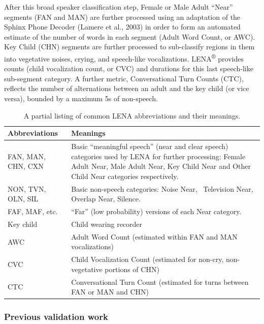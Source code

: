 \documentclass[english,table,man,floatsintext]{apa6}
\begin{document}
After this broad speaker classification step, Female or Male Adult
\enquote{Near} segments (FAN and MAN) are further processed using an
adaptation of the Sphinx Phone Decoder (Lamere et al., 2003) in order to
form an automated estimate of the number of words in each segment (Adult
Word Count, or AWC). Key Child (CHN) segments are further processed to
sub-classify regions in them into vegetative noises, crying, and
speech-like vocalizations. LENA\textsuperscript{®} provides counts
(child vocalization count, or CVC) and durations for this last
speech-like sub-segment category. A further metric, Conversational Turn
Counts (CTC), reflects the number of alternations between an adult and
the key child (or vice versa), bounded by a maximum 5s of non-speech.

\begin{table}

\caption{\label{tab:tab-abb}A partial listing of common LENA abbreviations and their meanings.}
\centering
\begin{tabular}[t]{>{\raggedright\arraybackslash}p{12em}>{\raggedright\arraybackslash}p{28em}}
\toprule
Abbreviations & Meanings\\
\midrule
FAN, MAN, CHN, CXN & Basic “meaningful speech” (near and clear speech) categories used by LENA for further processing: Female Adult Near, Male Adult Near, Key Child Near and Other Child Near categories respectively.\\
NON, TVN, OLN, SIL & Basic non-speech categories: Noise Near,  Television Near, Overlap Near, Silence.\\
FAF, MAF, etc. & “Far” (low probability) versions of each Near category.\\
Key child & Child wearing recorder\\
AWC & Adult Word Count (estimated within FAN and MAN vocalizations)\\
\addlinespace
CVC & Child Vocalization Count (estimated for non-cry, non-vegetative portions of CHN)\\
CTC & Conversational Turn Count (estimated for turns between FAN or MAN and CHN)\\
\bottomrule
\end{tabular}
\end{table}

\subsubsection{Previous validation work}\label{previous-validation-work}
\end{document}
